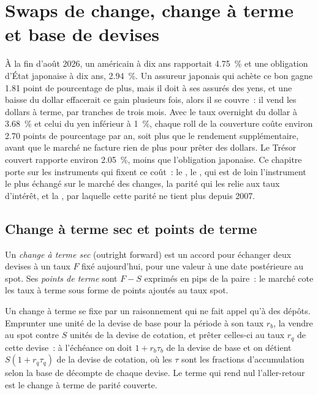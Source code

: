 \chapter{Swaps de change, change à terme et base de devises}\label{ch:m2:fx-swaps-forwards-and-the-cross-currency-basis}

À la fin d'août 2026, un  américain à dix ans rapportait 4.75~\% et une
obligation d'État japonaise à dix ans, 2.94~\%. Un assureur japonais qui achète ce bon
gagne 1.81 point de pourcentage de plus, mais il doit à ses assurés des yens, et une baisse
du dollar effacerait ce gain plusieurs fois, alors il se couvre~: il vend les
dollars à terme, par tranches de trois mois. Avec le taux overnight du dollar à
3.68~\% et celui du yen inférieur à 1~\%, chaque roll de la couverture coûte environ 2.70
points de pourcentage par an, soit plus que le rendement supplémentaire, avant que le marché
ne facture rien de plus pour prêter des dollars. Le Trésor couvert rapporte environ 2.05~\%,
moins que l'obligation japonaise. Ce chapitre porte sur les instruments qui fixent
ce coût~: le , le , qui est de loin l'instrument le plus
échangé sur le marché des changes, la parité qui les relie aux taux d'intérêt,
et la , par laquelle cette parité ne tient plus depuis 2007.

\section{Change à terme sec et points de terme}

\begin{definition}\label{def:m2:fx-swaps-forwards-and-the-cross-currency-basis:forward}
Un \emph{change à terme sec} (outright forward) est un accord pour échanger
deux devises à un taux $F$ fixé aujourd'hui, pour une valeur à une date postérieure au spot. Ses
\emph{points de terme} sont $F - S$ exprimés en pips de la
paire~: le marché cote les taux à terme sous forme de points ajoutés au taux spot.
\end{definition}

Un change à terme se fixe par un raisonnement qui ne fait appel qu'à des dépôts. Emprunter une
unité de la devise de base pour la période à son taux $r_b$, la vendre au spot contre $S$
unités de la devise de cotation, et prêter celles-ci au taux $r_q$ de cette devise~:
à l'échéance on doit $1 + r_b\tau_b$ de la devise de base et on détient $S(1 + r_q\tau_q)$ de la
devise de cotation, où les $\tau$ sont les fractions d'accumulation selon la base de décompte de chaque devise. Le
terme qui rend nul l'aller-retour est le change à terme de parité couverte.

